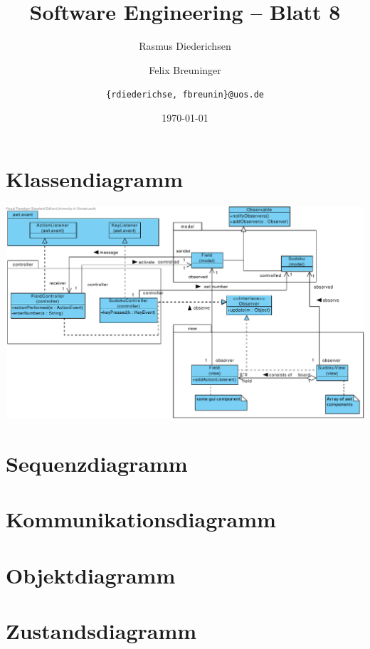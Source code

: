 \documentclass{scrartcl}
\title{\rmfamily Software Engineering -- Blatt 8}
\author{Rasmus Diederichsen \and Felix Breuninger\and 
   \texttt{\{rdiederichse, fbreunin\}@uos.de}
}
\date{\today}
\begin{document}
\selectfont
\maketitle

\section{Klassendiagramm}

\includegraphics[width=\linewidth]{aufg1-crop.pdf}

\section{Sequenzdiagramm}

\section{Kommunikationsdiagramm}

\section{Objektdiagramm}

\section{Zustandsdiagramm}
\end{document}
